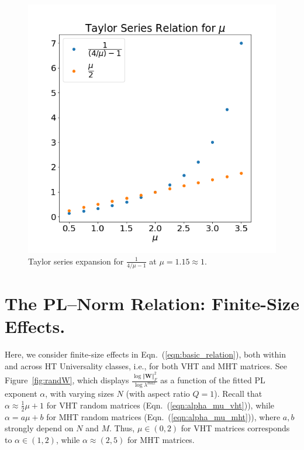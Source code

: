 {\begin{figure}[!htb]
   \centering
   \includegraphics[scale=0.30]{img/taylor-series.png} 
  \caption{%
           Taylor series expansion for $\frac{1}{4/\mu-1}$ at $\mu=1.15\approx1$.
          }
  \label{fig:taylor-series}
\end{figure}

\section{The PL--Norm Relation: Finite-Size Effects.}
\label{sxn:appendix-finite-size}


Here, we consider finite-size effects in Eqn.~(\ref{eqn:basic_relation}), both within and across HT Universality classes, i.e., for both VHT and MHT matrices.
See Figure~\ref{fig:randW}, which  displays $\frac{\log\Vert\mathbf{W}\Vert^{2}_{F}}{\log\lambda^{max}}$ as a function of the fitted PL exponent $\alpha$, with varying sizes $N$ (with aspect ratio $Q=1$).
Recall that $\alpha \approx \frac{1}{2}\mu+1$ for VHT random matrices (Eqn.~(\ref{eqn:alpha_mu_vht})), while $\alpha = a\mu+b$ for MHT random matrices (Eqn.~(\ref{eqn:alpha_mu_mht})), where $a,b$ strongly depend on $N$ and $M$.
Thus, $\mu\in(0,2)$ for VHT matrices corresponds to $\alpha\in(1,2)$, while $\alpha \approx(2,5)$ for MHT matrices.

}
